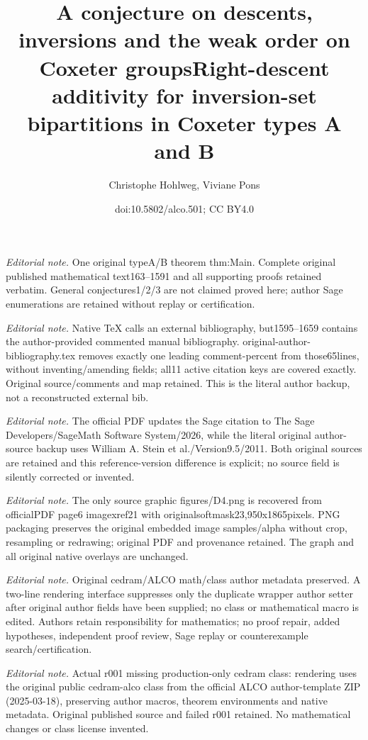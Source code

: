 \documentclass[Unicode]{cedram-alco}
\author[C. Hohlweg]{\firstname{Christophe} \lastname{Hohlweg}}
\author[V. Pons]{\firstname{Viviane} \lastname{Pons}}
\title[A conjecture on descents, inversions and the weak order]{A conjecture on descents, inversions and the weak order on Coxeter groups}
\title{Right-descent additivity for inversion-set bipartitions in Coxeter types A and B}
\author{Christophe Hohlweg, Viviane Pons}
\date{doi:10.5802/alco.501; CC BY4.0}
\theoremstyle{definition}
\begin{document}
\maketitle
\noindent\textit{Editorial note.} One original typeA/B theorem thm:Main. Complete original published mathematical text163--1591 and all supporting proofs retained verbatim. General conjectures1/2/3 are not claimed proved here; author Sage enumerations are retained without replay or certification.\par\medskip
\noindent\textit{Editorial note.} Native TeX calls an external bibliography, but1595--1659 contains the author-provided commented manual bibliography. original-author-bibliography.tex removes exactly one leading comment-percent from those65lines, without inventing/amending fields; all11 active citation keys are covered exactly. Original source/comments and map retained. This is the literal author backup, not a reconstructed external bib.\par\medskip
\noindent\textit{Editorial note.} The official PDF updates the Sage citation to The Sage Developers/SageMath Software System/2026, while the literal original author-source backup uses William A. Stein et al./Version9.5/2011. Both original sources are retained and this reference-version difference is explicit; no source field is silently corrected or invented.\par\medskip
\noindent\textit{Editorial note.} The only source graphic figures/D4.png is recovered from officialPDF page6 imagexref21 with originalsoftmask23,950x1865pixels. PNG packaging preserves the original embedded image samples/alpha without crop, resampling or redrawing; original PDF and provenance retained. The graph and all original native overlays are unchanged.\par\medskip
\noindent\textit{Editorial note.} Original cedram/ALCO math/class author metadata preserved. A two-line rendering interface suppresses only the duplicate wrapper author setter after original author fields have been supplied; no class or mathematical macro is edited. Authors retain responsibility for mathematics; no proof repair, added hypotheses, independent proof review, Sage replay or counterexample search/certification.\par\medskip
\noindent\textit{Editorial note.} Actual r001 missing production-only cedram class: rendering uses the original public cedram-alco class from the official ALCO author-template ZIP (2025-03-18), preserving author macros, theorem environments and native metadata. Original published source and failed r001 retained. No mathematical changes or class license invented.\par\medskip
\end{document}
